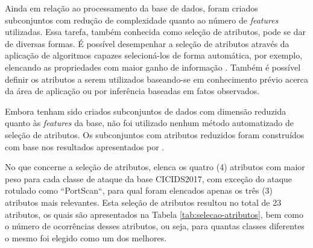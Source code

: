 \begin{comment}
Para os dados a serem submetidos aos modelos de classificação multi-classe foi utilizada a técnica de \textit{cost sensitive training} por meio da ponderação da função de custo durante o treinamento, aplicando pesos maiores para as classes minoritárias.
\end{comment}

Ainda em relação ao processamento da base de dados, foram criados subconjuntos com redução de complexidade quanto ao número de \textit{features} utilizadas. Essa tarefa, também conhecida como seleção de atributos, pode se dar de diversas formas. É possível desempenhar a seleção de atributos através da aplicação de algoritmos capazes selecioná-los de forma automática, por exemplo, elencando as propriedades com maior ganho de informação \cite{souza2018}. Também é possível definir os atributos a serem utilizados baseando-se em conhecimento prévio acerca da área de aplicação ou por inferência baseadas em fatos observados.

Embora tenham sido criados subconjuntos de dados com dimensão reduzida quanto às \textit{features} da base, não foi utilizado nenhum método automatizado de seleção de atributos. Os subconjuntos com atributos reduzidos foram construídos com base nos resultados apresentados por .

No que concerne a seleção de atributos,  elenca os quatro (4) atributos com maior peso para cada classe de ataque da base CICIDS2017, com exceção do ataque rotulado como ``PortScan``, para qual foram elencados apenas os três (3) atributos mais relevantes. Esta seleção de atributos resultou no total de 23 atributos, os quais são apresentados na Tabela \ref{tab:selecao-atributos}, bem como o número de ocorrências desses atributos, ou seja, para quantas classes diferentes o mesmo foi elegido como um dos melhores.

